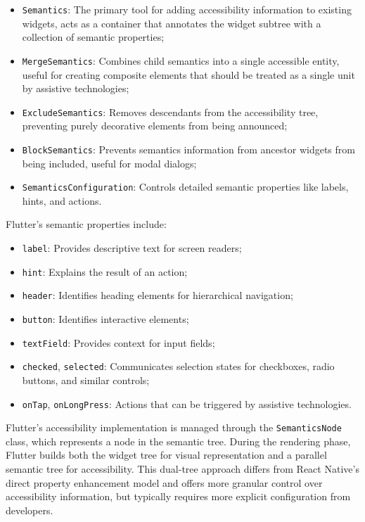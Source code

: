 \begin{itemize}
    \item \texttt{Semantics}: The primary tool for adding accessibility information to existing widgets, acts as a container that annotates the widget subtree with a collection of semantic properties;
    \item \texttt{MergeSemantics}: Combines child semantics into a single accessible entity, useful for creating composite elements that should be treated as a single unit by assistive technologies;
    \item \texttt{ExcludeSemantics}: Removes descendants from the accessibility tree, preventing purely decorative elements from being announced;
    \item \texttt{BlockSemantics}: Prevents semantics information from ancestor widgets from being included, useful for modal dialogs;
    \item \texttt{SemanticsConfiguration}: Controls detailed semantic properties like labels, hints, and actions.
\end{itemize}

Flutter's semantic properties include:
\begin{itemize}
    \item \texttt{label}: Provides descriptive text for screen readers;
    \item \texttt{hint}: Explains the result of an action;
    \item \texttt{header}: Identifies heading elements for hierarchical navigation;
    \item \texttt{button}: Identifies interactive elements;
    \item \texttt{textField}: Provides context for input fields;
    \item \texttt{checked}, \texttt{selected}: Communicates selection states for checkboxes, radio buttons, and similar controls;
    \item \texttt{onTap}, \texttt{onLongPress}: Actions that can be triggered by assistive technologies.
\end{itemize}

Flutter's accessibility implementation is managed through the \texttt{SemanticsNode} class, which represents a node in the semantic tree. During the rendering phase, Flutter builds both the widget tree for visual representation and a parallel semantic tree for accessibility. This dual-tree approach differs from React Native's direct property enhancement model and offers more granular control over accessibility information, but typically requires more explicit configuration from developers.

